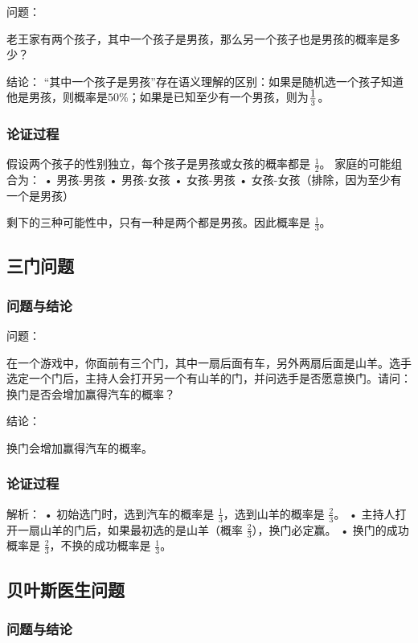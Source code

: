 问题：

老王家有两个孩子，其中一个孩子是男孩，那么另一个孩子也是男孩的概率是多少？

结论：
“其中一个孩子是男孩”存在语义理解的区别：如果是随机选一个孩子知道他是男孩，则概率是$50\%$；如果是已知至少有一个男孩，则为$\displaystyle 1\over 3$。

\subsubsection{论证过程}
假设两个孩子的性别独立，每个孩子是男孩或女孩的概率都是 $\frac{1}{2}$。
家庭的可能组合为：
	•	男孩-男孩
	•	男孩-女孩
	•	女孩-男孩
	•	女孩-女孩（排除，因为至少有一个是男孩）

剩下的三种可能性中，只有一种是两个都是男孩。因此概率是 $\frac{1}{3}$。

\subsection{三门问题}

\subsubsection{问题与结论}

问题：

在一个游戏中，你面前有三个门，其中一扇后面有车，另外两扇后面是山羊。选手选定一个门后，主持人会打开另一个有山羊的门，并问选手是否愿意换门。请问：换门是否会增加赢得汽车的概率？

结论：

换门会增加赢得汽车的概率。

\subsubsection{论证过程}


解析：
	•	初始选门时，选到汽车的概率是 $\frac{1}{3}$，选到山羊的概率是 $\frac{2}{3}$。
	•	主持人打开一扇山羊的门后，如果最初选的是山羊（概率 $\frac{2}{3}$），换门必定赢。
	•	换门的成功概率是 $\frac{2}{3}$，不换的成功概率是 $\frac{1}{3}$。

\subsection{贝叶斯医生问题}

\subsubsection{问题与结论}

